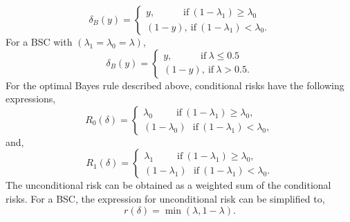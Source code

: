 \documentclass[a4paper,english,12pt]{article}
\begin{document}
\begin{exmp}
\begin{equation}
\delta_{B}(y)=\begin{cases}
y,\hspace{35pt}\mbox{if}~(1-\lambda_1)\geq\lambda_0\\
\left( 1-y\right), ~\mbox{if}~(1-\lambda_1)<\lambda_0.
\end{cases}
\end{equation}
For a BSC with $(\lambda_1=\lambda_0=\lambda)$,
\begin{equation}
\delta_{B}(y)=\begin{cases}
y,\hspace{35pt}\mbox{if}~\lambda\leq  0.5\\
\left( 1-y\right), ~\mbox{if}~\lambda>0.5.
\end{cases}
\end{equation}
For the optimal Bayes rule described above, conditional risks have the following expressions,
\begin{equation}
R_0(\delta)=\begin{cases}
\lambda_0~~~~~~~~~~~\mbox{if}~(1-\lambda_1)\geq\lambda_0, \\
\left(1-\lambda_0\right)~~~\mbox{if}~(1-\lambda_1)<\lambda_0,
\end{cases}
\end{equation}
and,
\begin{equation}
R_1(\delta)=\begin{cases}
\lambda_1~~~~~~~~~~~\mbox{if}~(1-\lambda_1)\geq\lambda_0, \\
\left( 1-\lambda_1\right)~~~\mbox{if}~(1-\lambda_1)<\lambda_0.
\end{cases}
\end{equation}
The unconditional risk can be obtained as a weighted sum of the conditional risks. For a BSC, the expression for unconditional risk can be simplified to,
\begin{equation}
r(\delta)= \min\left( \lambda,1-\lambda\right).
\end{equation}
\end{exmp}
\end{document}
